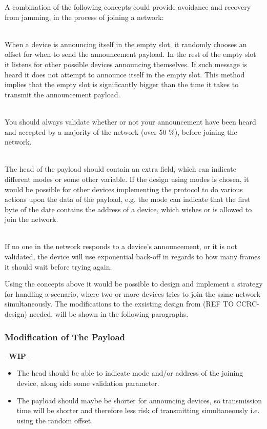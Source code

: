 A combination of the following concepts could provide avoidance and recovery from jamming, in the process of joining a network: 
\begin{description}[labelindent=\parindent]
    \item[Random Offset]\hfill\\
    When a device is announcing itself in the empty slot, it randomly chooses an offset for when to send the announcement payload.
    In the rest of the empty slot it listens for other possible devices announcing themselves.
    If such message is heard it does not attempt to announce itself in the empty slot.
    This method implies that the empty slot is significantly bigger than the time it takes to transmit the announcement payload.
    \item[Validation]\hfill\\
    You should always validate whether or not your announcement have been heard and accepted by a majority of the network (over 50 \%), before joining the network.
    \item[Payload Mode]\hfill\\
    The head of the payload should contain an extra field, which can indicate different modes or some other variable.
    If the design using modes is chosen, it would be possible for other devices implementing the protocol to do various actions upon the data of the payload, e.g. the mode can indicate that the first byte of the date contains the address of a device, which wishes or is allowed to join the network.
    \item[Exponential Back-off]\hfill\\ 
    If no one in the network responds to a device's announcement, or it is not validated, the device will use exponential back-off in regards to how many frames it should wait before trying again.
\end{description} 
\noindent
Using the concepts above it would be possible to design and implement a strategy for handling a scenario, where two or more devices tries to join the same network simultaneously.
The modifications to the exsisting design from (REF TO CCRC-design) needed, will be shown in the following paragraphs.

\subsubsection{Modification of The Payload} %
\label{ssub:modification_of_the_payload}
\textbf{--WIP--}
\begin{itemize}
    \item The head should be able to indicate mode and/or address of the joining device, along side some validation parameter.
    \item The payload should maybe be shorter for announcing devices, so transmission time will be shorter and therefore less risk of transmitting simultaneously i.e. using the random offset.
\end{itemize}

